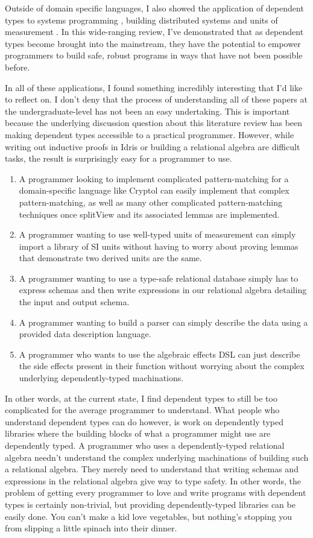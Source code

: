 Outside of domain specific languages, I also showed the application of dependent
types to systems programming \cite{idris_systems_programming}, building
distributed systems \cite{fstar_distributed_programming} and units of
measurement \cite{gundry2013}. In this wide-ranging review, I've demonstrated
that as dependent types become brought into the mainstream, they have the
potential to empower programmers to build safe, robust programs in ways that
have not been possible before. 

In all of these applications, I found something incredibly interesting that I'd
like to reflect on. I don't deny that the process of understanding all of these
papers at the undergraduate-level has not been an easy undertaking. This is
important because the underlying discussion question about this literature review has been making dependent types accessible to a practical programmer. However, while writing out inductive proofs in Idris or building a relational algebra are difficult tasks, the result is surprisingly easy for a programmer to use. 
\begin{enumerate}
    \item A programmer looking to implement complicated pattern-matching for a domain-specific language like Cryptol can easily implement that complex pattern-matching, as well as many other complicated pattern-matching techniques once splitView and its associated lemmas are implemented. 
    \item A programmer wanting to use well-typed units of measurement can simply import a library of SI units without having to worry about proving lemmas that demonstrate two derived units are the same. 
    \item A programmer wanting to use a type-safe relational database simply has to express schemas and then write expressions in our relational algebra detailing the input and output schema. 
    \item A programmer wanting to build a parser can simply describe the data using a provided data description language. 
    \item A programmer who wants to use the algebraic effects DSL can just describe the side effects present in their function without worrying about the complex underlying dependently-typed machinations. 
\end{enumerate}

In other words, at the current state, I find dependent types to still be too
complicated for the average programmer to understand. What people who understand
dependent types can do however, is work on dependently typed libraries where the
building blocks of what a programmer might use are dependently typed. A
programmer who uses a dependently-typed relational algebra needn't understand
the complex underlying machinations of building such a relational algebra. They
merely need to understand that writing schemas and expressions in the relational
algebra give way to type safety. In other words, the problem of getting every
programmer to love and write programs with dependent types is certainly
non-trivial, but providing dependently-typed libraries can be easily done. You
can't make a kid love vegetables, but nothing's stopping you from slipping a
little spinach into their dinner. 
